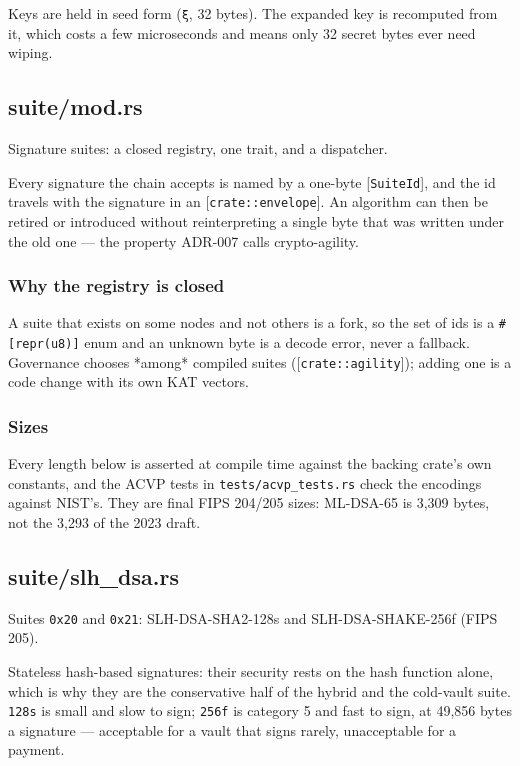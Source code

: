 \documentclass[11pt,a4paper]{article}
\begin{document}
Keys are held in seed form (\texttt{ξ}, 32 bytes). The expanded key is recomputed
from it, which costs a few microseconds and means only 32 secret bytes ever
need wiping.

\subsection{suite/mod.rs}
Signature suites: a closed registry, one trait, and a dispatcher.

Every signature the chain accepts is named by a one-byte [\texttt{SuiteId}], and
the id travels with the signature in an [\texttt{crate::envelope}]. An algorithm
can then be retired or introduced without reinterpreting a single byte that
was written under the old one — the property ADR-007 calls crypto-agility.

\subsubsection{Why the registry is closed}

A suite that exists on some nodes and not others is a fork, so the set of
ids is a \texttt{\#[repr(u8)]} enum and an unknown byte is a decode error, never a
fallback. Governance chooses *among* compiled suites ([\texttt{crate::agility}]);
adding one is a code change with its own KAT vectors.

\subsubsection{Sizes}

Every length below is asserted at compile time against the backing crate's
own constants, and the ACVP tests in \texttt{tests/acvp\_tests.rs} check the
encodings against NIST's. They are final FIPS 204/205 sizes: ML-DSA-65 is
3,309 bytes, not the 3,293 of the 2023 draft.

\subsection{suite/slh\_dsa.rs}
Suites \texttt{0x20} and \texttt{0x21}: SLH-DSA-SHA2-128s and SLH-DSA-SHAKE-256f
(FIPS 205).

Stateless hash-based signatures: their security rests on the hash
function alone, which is why they are the conservative half of the hybrid
and the cold-vault suite. \texttt{128s} is small and slow to sign; \texttt{256f} is
category 5 and fast to sign, at 49,856 bytes a signature — acceptable for a
vault that signs rarely, unacceptable for a payment.
\end{document}
